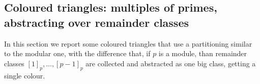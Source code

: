 \documentclass[10pt,a4paper]{article} %
\begin{document}
    
    


    
    


    
    

    
    

    \subsection{Coloured triangles: multiples of primes, abstracting over remainder classes}

    In this section we report some coloured triangles that use a partitioning similar to the modular one, 
    with the difference that, if $p$ is a module, than remainder classes $[1]_p, \ldots, [p-1]_p$
    are collected and abstracted as one big class, getting a single colour.
\end{document}
